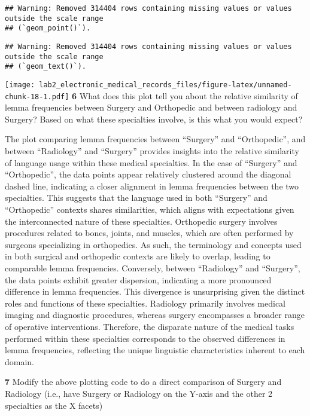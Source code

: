 \documentclass[
]{article}
\begin{document}
\begin{verbatim}
## Warning: Removed 314404 rows containing missing values or values outside the scale range
## (`geom_point()`).
\end{verbatim}

\begin{verbatim}
## Warning: Removed 314404 rows containing missing values or values outside the scale range
## (`geom_text()`).
\end{verbatim}

\texttt{[image: lab2\_electronic\_medical\_records\_files/figure-latex/unnamed-chunk-18-1.pdf]}
\textbf{6} What does this plot tell you about the relative similarity of
lemma frequencies between Surgery and Orthopedic and between radiology
and Surgery? Based on what these specialties involve, is this what you
would expect?

The plot comparing lemma frequencies between ``Surgery'' and
``Orthopedic'', and between ``Radiology'' and ``Surgery'' provides
insights into the relative similarity of language usage within these
medical specialties. In the case of ``Surgery'' and ``Orthopedic'', the
data points appear relatively clustered around the diagonal dashed line,
indicating a closer alignment in lemma frequencies between the two
specialties. This suggests that the language used in both ``Surgery''
and ``Orthopedic'' contexts shares similarities, which aligns with
expectations given the interconnected nature of these specialties.
Orthopedic surgery involves procedures related to bones, joints, and
muscles, which are often performed by surgeons specializing in
orthopedics. As such, the terminology and concepts used in both surgical
and orthopedic contexts are likely to overlap, leading to comparable
lemma frequencies. Conversely, between ``Radiology'' and ``Surgery'',
the data points exhibit greater dispersion, indicating a more pronounced
difference in lemma frequencies. This divergence is unsurprising given
the distinct roles and functions of these specialties. Radiology
primarily involves medical imaging and diagnostic procedures, whereas
surgery encompasses a broader range of operative interventions.
Therefore, the disparate nature of the medical tasks performed within
these specialties corresponds to the observed differences in lemma
frequencies, reflecting the unique linguistic characteristics inherent
to each domain.

\textbf{7} Modify the above plotting code to do a direct comparison of
Surgery and Radiology (i.e., have Surgery or Radiology on the Y-axis and
the other 2 specialties as the X facets)
\end{document}
